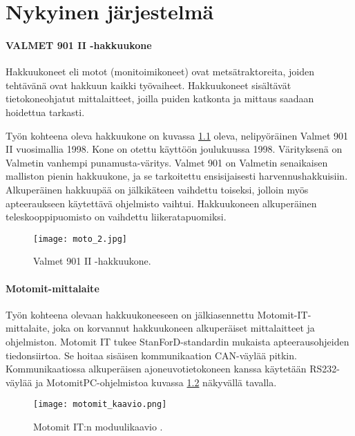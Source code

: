\newpage

\chapter{Nykyinen järjestelmä}

\subsubsection{VALMET 901 II -hakkuukone}
Hakkuukoneet eli motot (monitoimikoneet) ovat metsätraktoreita, joiden tehtävänä ovat hakkuun kaikki työvaiheet. Hakkuukoneet sisältävät tietokoneohjatut mittalaitteet, joilla puiden katkonta ja mittaus saadaan hoidettua tarkasti.

Työn kohteena oleva hakkuukone on kuvassa \ref{hakkuukone} oleva, nelipyöräinen Valmet 901 II vuosimallia 1998. Kone on otettu käyttöön joulukuussa 1998. Värityksenä on Valmetin vanhempi punamusta-väritys. Valmet 901 on Valmetin senaikaisen malliston pienin hakkuukone, ja se tarkoitettu ensisijaisesti harvennushakkuisiin. Alkuperäinen hakkuupää on jälkikäteen vaihdettu toiseksi, jolloin myös apteeraukseen käytettävä ohjelmisto vaihtui. Hakkuukoneen alkuperäinen teleskooppipuomisto on vaihdettu liikeratapuomiksi.
\newline

\begin{figure}[H]
\centering
\texttt{[image: moto\_2.jpg]}
\caption{Valmet 901 II -hakkuukone.}
\label{hakkuukone}
\end{figure}

\subsubsection{Motomit-mittalaite}
Työn kohteena olevaan hakkuukoneeseen on jälkiasennettu Motomit-IT-mittalaite, joka on korvannut hakkuukoneen alkuperäiset mittalaitteet ja ohjelmiston. Motomit IT tukee StanForD-standardin mukaista apteerausohjeiden tiedonsiirtoa. Se hoitaa sisäisen kommunikaation CAN-väylää pitkin. Kommunikaatiossa alkuperäisen ajoneuvotietokoneen kanssa käytetään RS232-väylää ja MotomitPC-ohjelmistoa kuvassa \ref{motomit:modulikaavio} näkyvällä tavalla. \citep{motomit:esite}
\newline

\begin{figure}[H]
\centering
\texttt{[image: motomit\_kaavio.png]}
\caption{Motomit IT:n moduulikaavio \cite{motomit:manual}.}
\label{motomit:modulikaavio}
\end{figure}
\newpage

